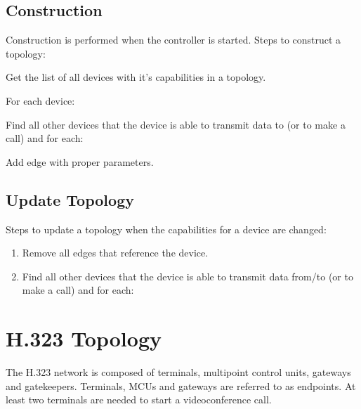 \documentclass[a4paper]{report}
\begin{document}
\subsection{Construction}

Construction is performed when the controller is started. Steps to construct a topology:

\begin{enumerate}

\item Get the list of all devices with it's capabilities in a topology.

\item For each device: 
  \begin{compactitem}
  \item Find all other devices that the device is able to transmit
  data to (or to make a call) and for each:
    \begin{compactitem}
    \item Add edge with proper parameters.
    \end{compactitem}
  \end{compactitem}

\end{enumerate}     

     
\subsection{Update Topology}     

Steps to update a topology when the capabilities for a device are changed:
\begin{enumerate}

\item Remove all edges that reference the device.

\item Find all other devices that the device is able to transmit data from/to
   (or to make a call) and for each:

\end{enumerate}  


\section{H.323 Topology}

The H.323 network is composed of terminals, multipoint control units, gateways and gatekeepers. Terminals, MCUs and gateways are referred to as endpoints. At least two terminals are needed to start a videoconference call.
\end{document}
